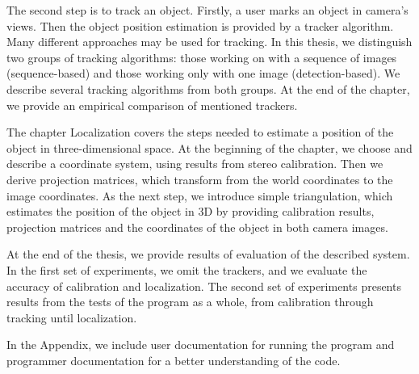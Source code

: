 The second step is to track an object. Firstly, a user marks an object in
camera's views. Then the object position estimation is provided by a tracker
algorithm. Many different approaches may be used for tracking. In this thesis,
we distinguish two groups of tracking algorithms: those working on with a
sequence of images (sequence-based) and those working only with one image
(detection-based). We describe several tracking algorithms from both groups. At
the end of the chapter, we provide an empirical comparison of mentioned
trackers.

The chapter Localization covers the steps needed to estimate a position of the
object in three-dimensional space. At the beginning of the chapter, we choose
and describe a coordinate system, using results from stereo calibration. Then
we derive projection matrices, which transform from the world coordinates to
the image coordinates. As the next step, we introduce simple triangulation,
which estimates the position of the object in 3D by providing calibration
results, projection matrices and the coordinates of the object in both camera
images.

At the end of the thesis, we provide results of evaluation of the described
system. In the first set of experiments, we omit the trackers, and we evaluate
the accuracy of calibration and localization. The second set of experiments
presents results from the tests of the program as a whole, from calibration
through tracking until localization.

In the Appendix, we include user documentation for running the program and
programmer documentation for a better understanding of the code.

